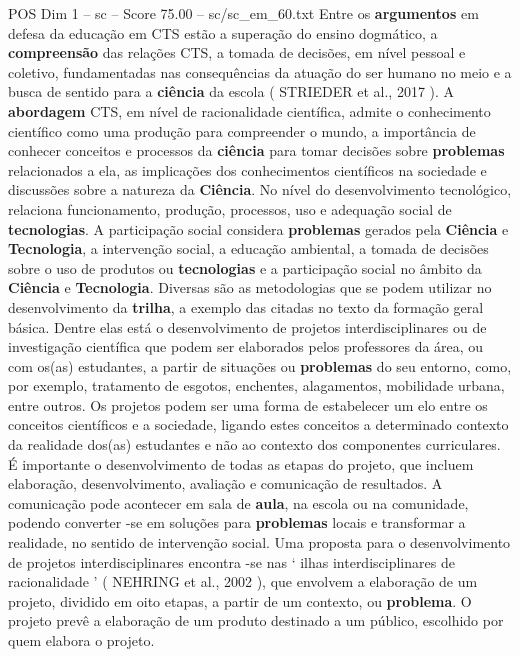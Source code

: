 \begin{textsample}{POS Dim 1 – sc – Score 75.00 – sc/sc\_em\_60.txt}
Entre os \textbf{argumentos} em defesa da educação em CTS estão a superação do ensino dogmático, a \textbf{compreensão} das relações CTS, a tomada de decisões, em nível pessoal e coletivo, fundamentadas nas consequências da atuação do ser humano no meio e a busca de sentido para a \textbf{ciência} da escola ( STRIEDER et al., 2017 ).
A \textbf{abordagem} CTS, em nível de racionalidade científica, admite o conhecimento científico como uma produção para compreender o mundo, a importância de conhecer conceitos e processos da \textbf{ciência} para tomar decisões sobre \textbf{problemas} relacionados a ela, as implicações dos conhecimentos científicos na sociedade e discussões sobre a natureza da \textbf{Ciência}.
No nível do desenvolvimento tecnológico, relaciona funcionamento, produção, processos, uso e adequação social de \textbf{tecnologias}.
A participação social considera \textbf{problemas} gerados pela \textbf{Ciência} e \textbf{Tecnologia}, a intervenção social, a educação ambiental, a tomada de decisões sobre o uso de produtos ou \textbf{tecnologias} e a participação social no âmbito da \textbf{Ciência} e \textbf{Tecnologia}.
Diversas são as metodologias que se podem utilizar no desenvolvimento da \textbf{trilha}, a exemplo das citadas no texto da formação geral básica.
Dentre elas está o desenvolvimento de projetos interdisciplinares ou de investigação científica que podem ser elaborados pelos professores da área, ou com os(as) estudantes, a partir de situações ou \textbf{problemas} do seu entorno, como, por exemplo, tratamento de esgotos, enchentes, alagamentos, mobilidade urbana, entre outros.
Os projetos podem ser uma forma de estabelecer um elo entre os conceitos científicos e a sociedade, ligando estes conceitos a determinado contexto da realidade dos(as) estudantes e não ao contexto dos componentes curriculares.
É importante o desenvolvimento de todas as etapas do projeto, que incluem elaboração, desenvolvimento, avaliação e comunicação de resultados.
A comunicação pode acontecer em sala de \textbf{aula}, na escola ou na comunidade, podendo converter -se em soluções para \textbf{problemas} locais e transformar a realidade, no sentido de intervenção social.
Uma proposta para o desenvolvimento de projetos interdisciplinares encontra -se nas ‘ ilhas interdisciplinares de racionalidade ’ ( NEHRING et al., 2002 ), que envolvem a elaboração de um projeto, dividido em oito etapas, a partir de um contexto, ou \textbf{problema}.
O projeto prevê a elaboração de um produto destinado a um público, escolhido por quem elabora o projeto.

\end{textsample}
